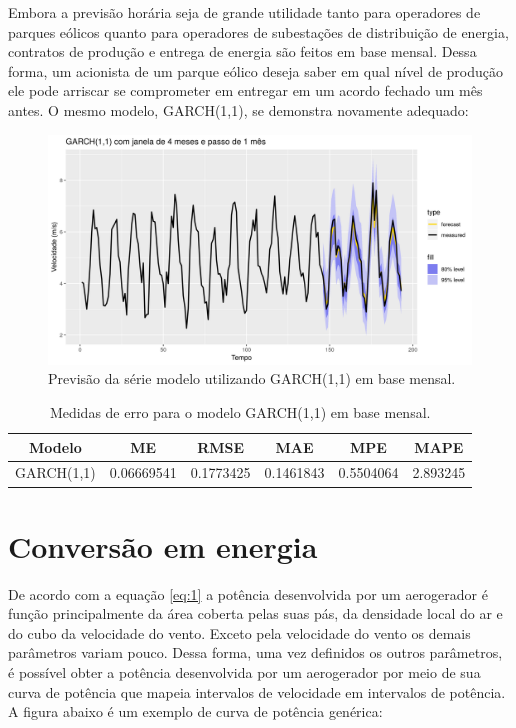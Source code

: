 \documentclass[
	12pt,				%
	openright,			%
	oneside,			%
	a4paper,			%
	english,			%
	french,				%
	spanish,			%
	brazil				%
	]{abntex2}
\begin{document}
Embora a previsão horária seja de grande utilidade tanto para operadores de parques eólicos quanto para operadores de subestações de distribuição de energia, contratos de produção e entrega de energia são feitos em base mensal. Dessa forma, um acionista de um parque eólico deseja saber em qual nível de produção ele pode arriscar se comprometer em entregar em um acordo fechado um mês antes. O mesmo modelo, GARCH(1,1), se demonstra novamente adequado:

\begin{figure}[h]
    \centering
	\includegraphics[width=\textwidth]{garch_month}
	\caption{Previsão da série modelo utilizando GARCH(1,1) em base mensal.}
\end{figure}
\FloatBarrier

\begin{table}[h]
\centering
\begin{tabular}{ |c|c|c|c|c|c| } 
\hline
\textbf{Modelo}&\textbf{ME}&\textbf{RMSE}&\textbf{MAE}&\textbf{MPE}&\textbf{MAPE}\\
\hline
GARCH(1,1)&0.06669541&0.1773425&0.1461843&0.5504064&2.893245\\
\hline
\end{tabular}
\caption{Medidas de erro para o modelo GARCH(1,1) em base mensal.}
\end{table}

\part{Conversão em energia}

De acordo com a equação \ref{eq:1} a potência desenvolvida por um aerogerador é função principalmente da área coberta pelas suas pás, da densidade local do ar e do cubo da velocidade do vento. Exceto pela velocidade do vento os demais parâmetros variam pouco. Dessa forma, uma vez definidos os outros parâmetros, é possível obter a potência desenvolvida por um aerogerador por meio de sua curva de potência que mapeia intervalos de velocidade em intervalos de potência. A figura abaixo é um exemplo de curva de potência genérica:
\end{document}
